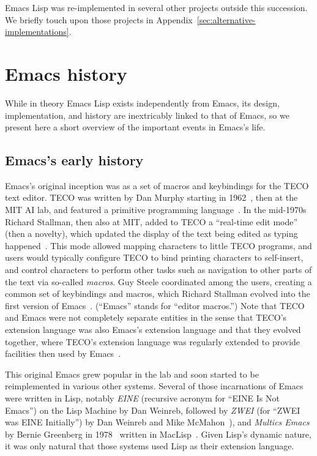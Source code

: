 \documentclass[format=acmsmall, review]{acmart}
\newcommand \Elisp {Emacs Lisp}
\begin{document}
\Elisp{} was re-implemented in several other projects outside this
succession.  We briefly touch upon those projects in
Appendix~\ref{sec:alternative-implementations}.  

\section{Emacs history}
\label{sec:emacs-history}

While in theory \Elisp{} exists independently from Emacs, its design,
implementation, and history are inextricably linked to that of Emacs, so we
present here a short overview of the important events in Emacs's life.

\subsection{Emacs's early history}
\label{sec:emacs-early-history}

Emacs's original inception was as a set of macros and keybindings for the
TECO text editor.  TECO was written by Dan Murphy starting in
1962~\cite{Murphy09}, then at the MIT AI lab, and featured a primitive
programming language~\cite{Stallman2018-personal}.  In the mid-1970s Richard
Stallman, then also at MIT, added to TECO a ``real-time edit mode'' (then
a novelty), which updated the display of the text being edited as typing
happened~\cite{MulticsEmacs1996}.  This mode allowed mapping characters to little TECO programs, and
users would typically configure TECO to bind printing characters to
self-insert, and control characters to perform other tasks such as
navigation to other parts of the text via so-called \textit{macros}.  Guy Steele
coordinated among the users, creating a common set of keybindings and macros, which
Richard Stallman evolved into the first version of
Emacs~\cite{EmacsLore,Seibel2009}.  (``Emacs'' stands for ``editor macros.'')
Note that TECO and Emacs were not completely separate entities in the sense
that TECO's extension language was also Emacs's extension language and that
they evolved together, where TECO's extension language was regularly
extended to provide facilities then used by Emacs~\cite{Stallman2002}.

This original Emacs grew popular in the lab and soon started to be
reimplemented in various other systems.  Several of those incarnations of
Emacs were written in Lisp, notably \emph{EINE} (recursive acronym for
``EINE Is Not Emacs'') on the Lisp Machine by Dan Weinreb, followed by
\emph{ZWEI} (for ``ZWEI was EINE Initially'') by Dan Weinreb and Mike
McMahon~\cite{Weinreb1979}), and \emph{Multics Emacs} by Bernie Greenberg in
1978~\cite{MulticsEmacs1996,Stallman2002} written in MacLisp~\cite{Moon1974,Pitman1983}.
Given Lisp's dynamic nature, it was only natural that those systems used
Lisp as their extension language.
\end{document}
